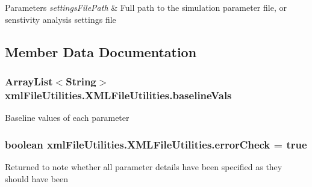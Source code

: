 \begin{DoxyParams}{Parameters}
{\em settings\+File\+Path} & Full path to the simulation parameter file, or senstivity analysis settings file \\
\hline
\end{DoxyParams}


\subsection{Member Data Documentation}
\hypertarget{classxmlFileUtilities_1_1XMLFileUtilities_a29f06ee2eff3920a793bf1418e04375b}{}
\subsubsection[{baseline\+Vals}]{\setlength{\rightskip}{0pt plus 5cm}Array\+List$<$String$>$ xml\+File\+Utilities.\+X\+M\+L\+File\+Utilities.\+baseline\+Vals\hspace{0.3cm}{\ttfamily [static]}}\label{classxmlFileUtilities_1_1XMLFileUtilities_a29f06ee2eff3920a793bf1418e04375b}
Baseline values of each parameter \hypertarget{classxmlFileUtilities_1_1XMLFileUtilities_a9d2c9fb596b4f8c0fff694f78259d786}{}
\subsubsection[{error\+Check}]{\setlength{\rightskip}{0pt plus 5cm}boolean xml\+File\+Utilities.\+X\+M\+L\+File\+Utilities.\+error\+Check = true\hspace{0.3cm}{\ttfamily [static]}}\label{classxmlFileUtilities_1_1XMLFileUtilities_a9d2c9fb596b4f8c0fff694f78259d786}
Returned to note whether all parameter details have been specified as they should have been \hypertarget{classxmlFileUtilities_1_1XMLFileUtilities_aff7782e4e87133c300f459f956acdacf}{}
